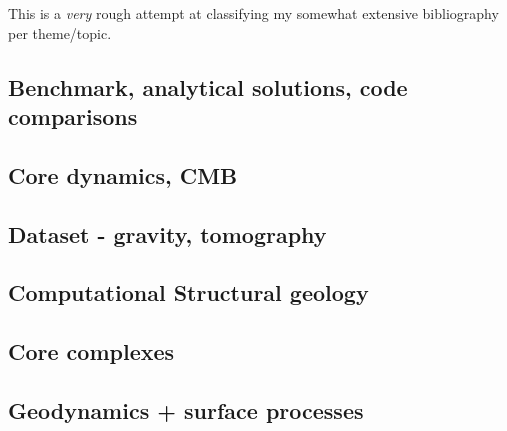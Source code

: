 This is a {\it very} rough attempt at classifying my somewhat extensive 
bibliography per theme/topic.
 


\subsection*{Benchmark, analytical solutions, code comparisons}

\cite{yusa84}
\cite{zhon96}
\cite{lind99}
\cite{zhmt08}
\cite{lelk15}

\subsection*{Core dynamics, CMB}

\cite{hayu96}
\cite{lahb08}

\subsection*{Dataset - gravity, tomography}

\cite{hawj12}

\subsection*{Computational Structural geology}

\cite{acgf00}

\subsection*{Core complexes}

\cite{lehm12}

\subsection*{Geodynamics + surface processes}

\cite{howa94}
\cite{avbu96}
\cite{zemk01}
\cite{lave05}
\cite{alle08}
\cite{vehc13}

